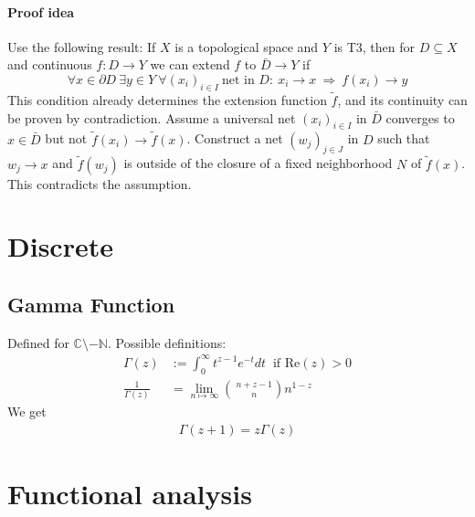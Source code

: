 \documentclass{scrartcl}
\begin{document}
\paragraph{Proof idea} Use the following result: If $X$ is a topological space and $Y$ is T3, then for $D \subseteq X$ and continuous $f: D \to Y$ we can extend $f$ to $\bar{D} \to Y$ if 
\begin{equation*}
    \forall x \in \partial D \ \exists y \in Y \ \forall (x_i)_{i \in I} \ \text{net in $D$}: \ x_i \to x \ \Rightarrow \ f(x_i) \to y
\end{equation*}
This condition already determines the extension function $\tilde{f}$, and its continuity can be proven by contradiction. Assume a universal net $(x_i)_{i \in I}$ in $\bar{D}$ converges to $x \in \bar{D}$ but not $\tilde{f}(x_i) \to \tilde{f}(x)$. Construct a net $(w_j)_{j \in J}$ in $D$ such that $w_j \to x$ and $\tilde{f}(w_j)$ is outside of the closure of a fixed neighborhood $N$ of $\tilde{f}(x)$. This contradicts the assumption.

\section{Discrete}

\subsection{Gamma Function}
Defined for $\mathbb{C} \setminus -\mathbb{N}$. Possible definitions:
\begin{equation}
    \begin{split}
        \Gamma(z) &:= \int_0^{\infty} t^{z - 1} e^{-t} dt \ \text{ if } \text{Re}(z) > 0\\
        \frac 1 {\Gamma(z)} &= \lim_{n \mapsto \infty} {\ n + z - 1 \choose\ n } n^{1-z}\nonumber
    \end{split}
\end{equation}
We get
\begin{equation}
    \begin{split}
        \Gamma(z + 1) = z\Gamma(z) \nonumber
    \end{split}
\end{equation}

\section{Functional analysis}
\end{document}
